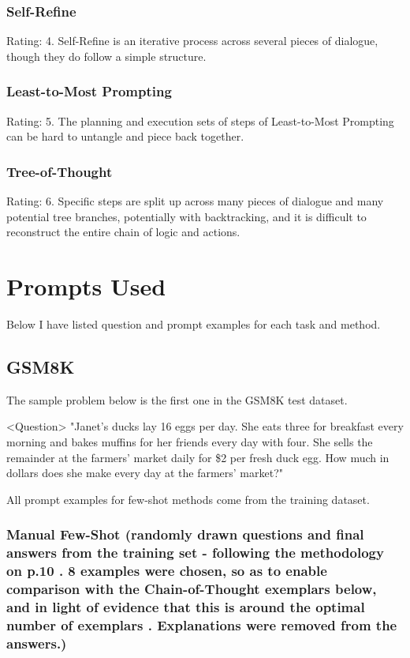 \documentclass[11pt]{article}
\begin{document}
\subsubsection*{Self-Refine}

Rating: 4. Self-Refine is an iterative process across several pieces of dialogue, though they do follow a simple structure.

\subsubsection*{Least-to-Most Prompting}

Rating: 5. The planning and execution sets of steps of Least-to-Most Prompting can be hard to untangle and piece back together.

\subsubsection*{Tree-of-Thought}

Rating: 6. Specific steps are split up across many pieces of dialogue and many potential tree branches, potentially with backtracking, and it is difficult to reconstruct the entire chain of logic and actions.

\clearpage
\newpage

\section{Prompts Used}
\label{sec:prompts}

Below I have listed question and prompt examples for each task and method.

\subsection{GSM8K}

The sample problem below is the first one in the GSM8K test dataset. \cite{cobbe_training_2021}

<Question> "Janet's ducks lay 16 eggs per day. She eats three for breakfast every morning and bakes muffins for her friends every day with four. She sells the remainder at the farmers' market daily for \$2 per fresh duck egg. How much in dollars does she make every day at the farmers' market?"

All prompt examples for few-shot methods come from the training dataset.

\subsubsection*{Manual Few-Shot (randomly drawn questions and final answers from the training set - following the methodology on p.10 \citealp{brown_language_2020}. 8 examples were chosen, so as to enable comparison with the Chain-of-Thought exemplars below, and in light of evidence that this is around the optimal number of exemplars \cite{min_rethinking_2022}. Explanations were removed from the answers.)}
\end{document}
